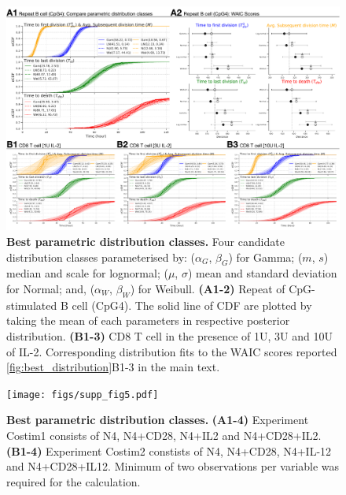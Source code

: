 \documentclass[11pt, a4paper]{article}
\begin{document}
\clearpage
\begin{figure}[h]
    \centering
    \includegraphics[scale=0.45]{figs/supp_fig4.pdf}
    \caption{\textbf{Best parametric distribution classes.} Four candidate distribution classes parameterised by: ($\alpha_G$, $\beta_G$) for Gamma; ($m$, $s$) median and scale for lognormal; ($\mu$, $\sigma$) mean and standard deviation for Normal; and, ($\alpha_W$, $\beta_W$) for Weibull. \textbf{(A1-2)} Repeat of CpG-stimulated B cell (CpG4). The solid line of CDF are plotted by taking the mean of each parameters in respective posterior distribution. \textbf{(B1-3)} CD8 T cell in the presence of 1U, 3U and 10U of IL-2. Corresponding distribution fits to the WAIC scores reported \cref{fig:best_distribution}B1-3 in the main text.}
    \label{supp_fig:best_distribution}
\end{figure}

\begin{figure}[h]
    \centering
    \texttt{[image: figs/supp\_fig5.pdf]}
    \caption{\textbf{Best parametric distribution classes.} \textbf{(A1-4)} Experiment Costim1 consists of N4, N4+CD28, N4+IL2 and N4+CD28+IL2. \textbf{(B1-4)} Experiment Costim2 constists of N4, N4+CD28, N4+IL-12 and N4+CD28+IL12. Minimum of two observations per variable was required for the calculation.}
    \label{supp_fig:costim_best_distribution}
\end{figure}
\end{document}
